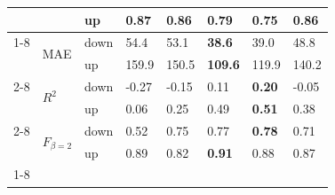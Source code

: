 \begin{table}
\begin{tabular}{llllllll}
 &  & up & \textbf{0.87} & 0.86 & 0.79 & 0.75 & 0.86 \\
\cline{1-8} \cline{2-8}
\multirow[t]{6}{*}{TransnetBW} & \multirow[t]{2}{*}{MAE} & down & 54.4 & 53.1 & \textbf{38.6} & 39.0 & 48.8 \\
 &  & up & 159.9 & 150.5 & \textbf{109.6} & 119.9 & 140.2 \\
\cline{2-8}
 & \multirow[t]{2}{*}{$R^2$} & down & -0.27 & -0.15 & 0.11 & \textbf{0.20} & -0.05 \\
 &  & up & 0.06 & 0.25 & 0.49 & \textbf{0.51} & 0.38 \\
\cline{2-8}
 & \multirow[t]{2}{*}{$F_{\beta=2}$} & down & 0.52 & 0.75 & 0.77 & \textbf{0.78} & 0.71 \\
 &  & up & 0.89 & 0.82 & \textbf{0.91} & 0.88 & 0.87 \\
\cline{1-8} \cline{2-8}
\bottomrule
\end{tabular}
\end{table}

